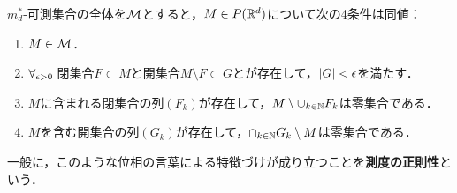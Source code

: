 \documentclass[uplatex, dvipdfmx]{jsreport}
\begin{document}
\begin{theorem}[Lebesgue可測集合の特徴付け]
    $m^*_d$-可測集合の全体を$\mathcal{M}$とすると，$M\in P(\mathbb{R}^d)$について次の4条件は同値：
    \begin{enumerate}
        \item $M\in\mathcal{M}$．
        \item $\forall_{\epsilon>0}\;$閉集合$F\subset M$と開集合$M\setminus F\subset G$とが存在して，$\lvert G\rvert<\epsilon$を満たす．
        \item $M$に含まれる閉集合の列$(F_k)$が存在して，$M\setminus\cup_{k\in\mathbb{N}}F_k$は零集合である．
        \item $M$を含む開集合の列$(G_k)$が存在して，$\cap_{k\in\mathbb{N}}G_k\setminus M$は零集合である．
    \end{enumerate}
    一般に，このような位相の言葉による特徴づけが成り立つことを\textbf{測度の正則性}という．
\end{theorem}
\end{document}
